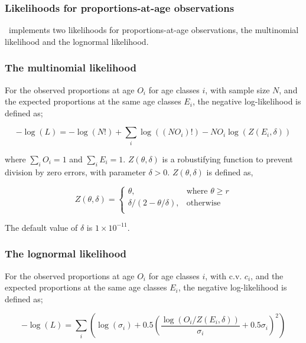{{\TODOend

\subsubsection{Likelihoods for proportions-at-age observations}

\SPM\ implements two likelihoods for proportions-at-age observations, the multinomial likelihood and the lognormal likelihood. 

\subsubsection*{The multinomial likelihood}

For the observed proportions at age $O_i$ for age classes $i$, with sample size $N$, and the expected proportions at the same age classes $E_i$, the negative log-likelihood is defined as; 

\begin{equation}
  -\log \left(L \right) =  -\log \left(N! \right) + \sum\limits_i \log \left( \left(NO_i \right)! \right) - NO_i \log \left(Z \left(E_i,\delta \right) \right)
\end{equation}

where $\sum\limits_i O_i = 1$ and $\sum\limits_i E_i = 1$. $Z \left(\theta,\delta \right)$ is a robustifying function to prevent division by zero errors, with parameter $\delta>0$. $Z \left(\theta,\delta \right)$ is defined as,

\begin{equation}
   Z \left(\theta,\delta \right) = \begin{cases}
	  \theta, & \text{where $\theta \ge r$} \\
	  \delta/\left( 2-\theta/\delta \right), & \text{otherwise} \\  
  \end{cases}
\end{equation}

The default value of $\delta$ is $1 \times 10^{-11}$.

\subsubsection*{The lognormal likelihood}

For the observed proportions at age $O_i$ for age classes $i$, with c.v. $c_i$, and the expected proportions at the same age classes $E_i$, the negative log-likelihood is defined as; 

\begin{equation}
 - \log \left(L \right) = \sum\limits_i \left( \log \left( \sigma _i \right) + 0.5\left( \frac{\log \left(O_i / Z \left(E_i,\delta \right) \right)}{\sigma_i} + 0.5 \sigma_i \right)^2 \right)
\end{equation}

}}
